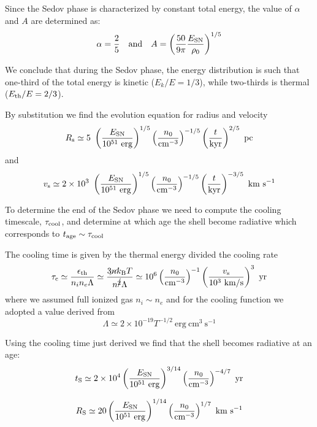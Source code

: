Since the Sedov phase is characterized by constant total energy, the value of \( \alpha \) and \( A \) are determined as:
%
\[ 
\alpha = \frac{2}{5} \quad \text{and} \quad A = \left( \frac{50}{9\pi} \frac{E_{\rm SN}}{\rho_0} \right)^{1/5} 
\]

We conclude that during the Sedov phase, the energy distribution is such that one-third of the total energy is kinetic (\( E_k / E = 1/3 \)), while two-thirds is thermal (\( E_{\rm th} / E = 2/3 \)). 



By substitution we find the evolution equation for radius and velocity
%
\[
R_{\rm s} \simeq 5~\left(\frac{E_{\rm SN}}{10^{51}~\text{erg}}\right)^{1/5} \left(\frac{n_0}{\text{cm}^{-3}}\right)^{-1/5} \left(\frac{t}{\text{kyr}}\right)^{2/5}~\text{pc}
\]
%
and
%
\[
v_{\rm s} \simeq 2 \times 10^3~\left(\frac{E_{\rm SN}}{10^{51}~\text{erg}}\right)^{1/5} \left(\frac{n_0}{\text{cm}^{-3}}\right)^{-1/5} \left(\frac{t}{\text{kyr}}\right)^{-3/5}~\text{km}~\text{s}^{-1}
\]

To determine the end of the Sedov phase we need to compute the cooling timescale, \( \tau_{\rm cool} \), and determine at which age the shell become radiative which corresponds to \( t_{\rm age} \sim \tau_{\rm cool} \)

The cooling time is given by the thermal energy divided the cooling rate
%
\[
\tau_{\rm c} \simeq \frac{\epsilon_{\rm th}}{n_i n_e \Lambda} \simeq \frac{3 \cancel{n} k_{\rm B} T}{n^{\cancel{2}} \Lambda} \simeq 10^6 \left( \frac{n_0}{\text{cm}^{-3}} \right)^{-1} \left( \frac{v_{\rm s}}{10^3~\text{km/s}} \right)^3~\text{yr}
\]
%
where we assumed full ionized gas \( n_i \sim n_e \) and for the cooling function we adopted a value derived from~\cite{}
%
\[
\Lambda \simeq 2 \times 10^{-19} T^{-1/2}~\text{erg}~\text{cm}^3~\text{s}^{-1}
\]

Using the cooling time just derived we find that the shell becomes radiative at an age:
%
\[
t_{\rm S} \simeq 2 \times 10^4 \left( \frac{E_{\rm SN}}{10^{51}~\text{erg}}\right)^{3/14} \left( \frac{n_0}{\text{cm}^{-3}} \right)^{-4/7}~\text{yr}
\]

\[
R_{\rm S} \simeq 20 \left( \frac{E_{\rm SN}}{10^{51}~\text{erg}} \right)^{1/14} \left( \frac{n_0}{\text{cm}^{-3}} \right)^{1/7}~\text{km}~\text{s}^{-1}
\]

